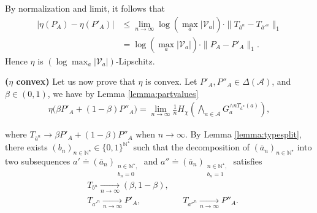 \documentclass[conference,a4paper]{IEEEtran}
\begin{document}
By normalization and limit, it follows that
\begin{align}
    |\eta(P_A)-\eta(P'_A)| & \leq \lim_{n \rightarrow \infty} \log\left(\max_a |\mathcal{V}_a|\right)\cdot\|T_{\overline{a}^n}-T_{\overline{a}'^n}\|_1 \\
    & = \log\left(\max_a |\mathcal{V}_a|\right)\cdot\|P_A - P'_A\|_1.\label{eq:Th3G}
\end{align}
Hence $\eta$ is $(\log \max_a |\mathcal{V}_a|)$-Lipschitz.\newline

\textbf{($\eta$ convex)} Let us now prove that $\eta$ is convex. Let $P'_A, P''_A \in \Delta(\mathcal{A})$, and $\beta \in (0,1)$, we have by Lemma \ref{lemma:partvalues}
\begin{align}
    \eta\big(\beta P'_A + (1-\beta) P''_A\big) = \lim_{n \rightarrow \infty} \frac{1}{n} H_\chi\left(\bigwedge_{a \in \mathcal{A}} G_a^{\wedge n T_{\overline{a}^n} (a)}\right),\label{eq:Th3H}
\end{align}

where $T_{\overline{a}^n} \rightarrow \beta P'_A + (1-\beta) P''_A$ when $n \rightarrow \infty$. By Lemma \ref{lemma:typesplit}, there exists $(b_n)_{n \in \mathbb{N}^\star} \in \lbrace 0,1\rbrace^{\mathbb{N}^\star}$ such that the decomposition of $(\overline{a}_n)_{n \in \mathbb{N}^\star}$ into two subsequences $a' \doteq (\overline{a}_n)_{\substack{n\in \mathbb{N}^\star, \\ b_n = 0}}$ and $a'' \doteq (\overline{a}_n)_{\substack{n\in \mathbb{N}^\star, \\ b_n = 1}}$ satisfies
    \begin{align}
        & T_{b^n} \underset{n \rightarrow \infty}{\rightarrow} (\beta,1-\beta), & &  \label{eq:Th3J}\\
        & T_{a'^n} \underset{n \rightarrow \infty}{\rightarrow} P'_A, & & T_{a''^n} \underset{n \rightarrow \infty}{\rightarrow} P''_A.\label{eq:Th3K}
    \end{align}
\end{document}
